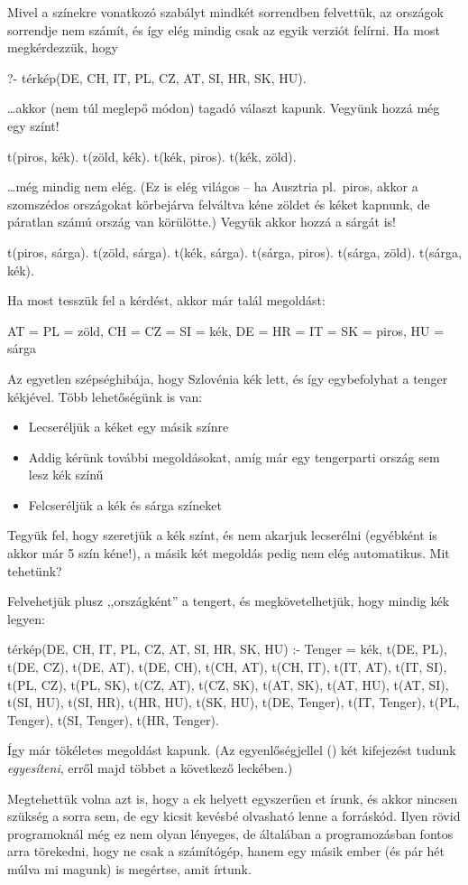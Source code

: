 Mivel a színekre vonatkozó szabályt mindkét
sorrendben felvettük, az országok sorrendje nem
számít, és így elég mindig csak az egyik verziót
felírni. Ha most megkérdezzük, hogy
\begin{query}
?- térkép(DE, CH, IT, PL, CZ, AT, SI, HR, SK, HU).
\end{query}
\dots akkor (nem túl meglepő módon) tagadó választ
kapunk. Vegyünk hozzá még egy színt!
\begin{program}
t(piros, kék). t(zöld, kék).
t(kék, piros). t(kék, zöld).
\end{program}
\dots még mindig nem elég. (Ez is elég világos -- ha
Ausztria pl.~piros, akkor a szomszédos országokat
körbejárva felváltva kéne zöldet és kéket kapnunk,
de páratlan számú ország van körülötte.)
Vegyük akkor hozzá a sárgát is!
\begin{program}
t(piros, sárga). t(zöld, sárga). t(kék, sárga).
t(sárga, piros). t(sárga, zöld). t(sárga, kék).
\end{program}
Ha most tesszük fel a kérdést, akkor már talál
megoldást:
\begin{query}
AT = PL = zöld,
CH = CZ = SI = kék,
DE = HR = IT = SK = piros,
HU = sárga
\end{query}
Az egyetlen szépséghibája, hogy Szlovénia kék lett,
és így egybefolyhat a tenger kékjével. Több
lehetőségünk is van:
\begin{itemize}
\item Lecseréljük a kéket egy másik színre
\item Addig kérünk további megoldásokat, amíg már
  egy tengerparti ország sem lesz kék színű
\item Felcseréljük a kék és sárga színeket
\end{itemize}

Tegyük fel, hogy szeretjük a kék színt, és nem
akarjuk lecserélni (egyébként is akkor már 5
szín kéne!), a másik két megoldás pedig nem elég
automatikus. Mit tehetünk?

Felvehetjük plusz ,,országként'' a tengert, és
megkövetelhetjük, hogy mindig kék legyen:
\begin{program}
térkép(DE, CH, IT, PL, CZ, AT, SI, HR, SK, HU) :-
    Tenger = kék,
    t(DE, PL), t(DE, CZ), t(DE, AT), t(DE, CH),
    t(CH, AT), t(CH, IT),
    t(IT, AT), t(IT, SI),
    t(PL, CZ), t(PL, SK),
    t(CZ, AT), t(CZ, SK),
    t(AT, SK), t(AT, HU), t(AT, SI),
    t(SI, HU), t(SI, HR),
    t(HR, HU),
    t(SK, HU),
    t(DE, Tenger), t(IT, Tenger), t(PL, Tenger),
    t(SI, Tenger), t(HR, Tenger).
\end{program}
Így már tökéletes megoldást kapunk.\index{\pr{=}}
(Az egyenlőségjellel (\pr{=}) két kifejezést tudunk
\emph{egyesíteni}, erről majd többet a következő
leckében.)

Megtehettük volna azt is, hogy a ek
helyett egyszerűen et írunk, és akkor
nincsen szükség a  sorra sem, de
egy kicsit kevésbé olvasható lenne a
forráskód. Ilyen rövid programoknál még ez nem olyan
lényeges, de általában a programozásban fontos arra
törekedni, hogy ne csak a számítógép, hanem egy
másik ember (és pár hét múlva mi magunk) is
megértse, amit írtunk.
